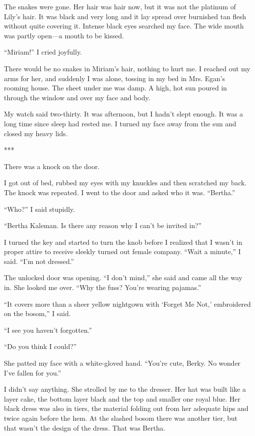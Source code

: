 \documentclass{novel}
\begin{document}
The snakes were gone. Her hair was hair now, but it was not the platinum of Lily’s hair. It was black and very long and it lay spread over burnished tan flesh without quite covering it. Intense black eyes searched my face. The wide mouth was partly open—a mouth to be kissed.

“Miriam!” I cried joyfully.

There would be no snakes in Miriam’s hair, nothing to hurt me. I reached out my arms for her, and suddenly I was alone, tossing in my bed in Mrs. Egan’s rooming house. The sheet under me was damp. A high, hot sun poured in through the window and over my face and body.

My watch said two-thirty. It was afternoon, but I hadn’t slept enough. It was a long time since sleep had rested me. I turned my face away from the sun and closed my heavy lids.

***

There was a knock on the door.

I got out of bed, rubbed my eyes with my knuckles and then scratched my back. The knock was repeated. I went to the door and asked who it was. “Bertha.”

“Who?” I said stupidly.

“Bertha Kaleman. Is there any reason why I can’t be invited in?”

I turned the key and started to turn the knob before I realized that I wasn’t in proper attire to receive sleekly turned out female company. “Wait a minute,” I said. “I’m not dressed.”

The unlocked door was opening. “I don’t mind,” she said and came all the way in. She looked me over. “Why the fuss? You’re wearing pajamas.”

“It covers more than a sheer yellow nightgown with ‘Forget Me Not,’ embroidered on the bosom,” I said.

“I see you haven’t forgotten.”

“Do you think I could?”

She patted my face with a white-gloved hand. “You’re cute, Berky. No wonder I’ve fallen for you.”

I didn’t say anything. She strolled by me to the dresser. Her hat was built like a layer cake, the bottom layer black and the top and smaller one royal blue. Her black dress was also in tiers, the material folding out from her adequate hips and twice again before the hem. At the slashed bosom there was another tier, but that wasn’t the design of the dress. That was Bertha.
\end{document}
